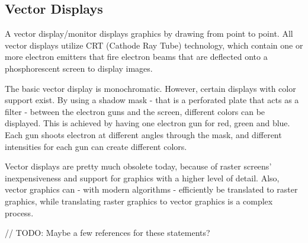 \subsection{Vector Displays}
A vector display/monitor displays graphics by drawing from point to point. 
All vector displays utilize CRT (Cathode Ray Tube) technology, which contain one or more electron emitters that fire electron beams that are deflected onto a phosphorescent screen to display images.

The basic vector display is monochromatic. 
However, certain displays with color support exist. 
By using a shadow mask - that is a perforated plate that acts as a filter - between the electron guns and the screen, different colors can be displayed. This is achieved by having one electron gun for red, green and blue. Each gun shoots electron at different angles through the mask, and different intensities for each gun can create different colors.

Vector displays are pretty much obsolete today, because of raster screens' inexpensiveness and support for graphics with a higher level of detail. 
Also, vector graphics can - with modern algorithms - efficiently be translated to raster graphics, while translating raster graphics to vector graphics is a complex process.

// TODO: Maybe a few references for these statements?